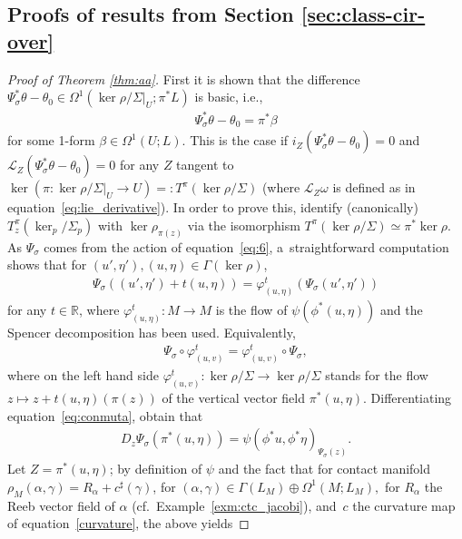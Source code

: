 \documentclass[10pt,a4paper]{amsart}
\numberwithin{equation}{section}
\newcommand{\RR}{\mathbb{R}}
\begin{document}
\subsection*{Proofs of results from Section \ref{sec:class-cir-over}}
\begin{proof}[Proof of Theorem \ref{thm:aa}] First it is shown that the dif\/ference $\Psi_\sigma^*\theta-\theta_0\in\Omega^1(\ker\rho/\Sigma|_U;\pi^*L)$
is basic, i.e.,
\begin{gather}\label{eqn:contact form}
\Psi_\sigma^*\theta-\theta_0=\pi^*\beta
\end{gather}
for some 1-form $\beta\in\Omega^1(U;L)$. This is the case if $i_Z(\Psi_\sigma^*\theta-\theta_0)=0$ and $\mathcal{L}_Z(\Psi_\sigma^*\theta-\theta_0)=0$ for any $Z$ tangent to $\ker(\pi\colon \ker\rho/\Sigma|_U\to U) =: T^{\pi}(\ker \rho/\Sigma)$ (where $\mathcal{L}_Z\omega$ is
def\/ined as in equation~\eqref{eq:lie_derivative}). In order to prove this, identify (canonically) $T^\pi_{z}(\ker_{p}/\Sigma_p)$ with $\ker\rho_{\pi(z)}$ via the isomorphism $T^\pi(\ker\rho/\Sigma)\simeq \pi^*\ker\rho$. As $\Psi_\sigma$ comes from the action of equation~\eqref{eq:6}, a~straightforward computation shows that for $(u',\eta'),(u,\eta)\in \Gamma(\ker\rho)$,
\begin{gather*}
 \Psi_\sigma((u',\eta')+t(u,\eta))=\varphi^t_{(u,\eta)}(\Psi_\sigma(u',\eta'))
\end{gather*}
for any $t\in\RR$, where $\varphi^t_{(u,\eta)} \colon M\to M$ is the f\/low of $\psi(\phi^*(u,\eta))$ and the Spencer decomposition has been used. Equivalently,
\begin{gather}\label{eq:conmuta}\Psi_\sigma\circ \varphi^t_{(u,v)}=\varphi^t_{(u,v)}\circ\Psi_\sigma,\end{gather}
where on the left hand side $\varphi^t_{(u,v)}\colon \ker\rho/\Sigma\to\ker\rho/\Sigma$ stands for the f\/low $z\mapsto z+t(u,\eta)(\pi(z))$ of the vertical vector f\/ield $\pi^*(u,\eta)$. Dif\/ferentiating equation~\eqref{eq:conmuta}, obtain that
\begin{gather*}
 D_{z}\Psi_\sigma(\pi^*(u,\eta))=\psi(\phi^*u,\phi^*\eta)_{\Psi_\sigma(z)}.
\end{gather*}
Let $Z=\pi^*(u,\eta)$; by def\/inition of $\psi$ and the fact that for contact manifold $\rho_M(\alpha,\gamma)=R_\alpha+c^\sharp(\gamma)$, for $(\alpha,\gamma)\in\Gamma(L_M)\oplus\Omega^1(M;L_M),$ for $R_\alpha$ the Reeb vector f\/ield of $\alpha$ (cf.\ Example~\ref{exm:ctc_jacobi}), and~$c$ the curvature map of equation~\eqref{curvature}, the above yields

\end{proof}
\end{document}
